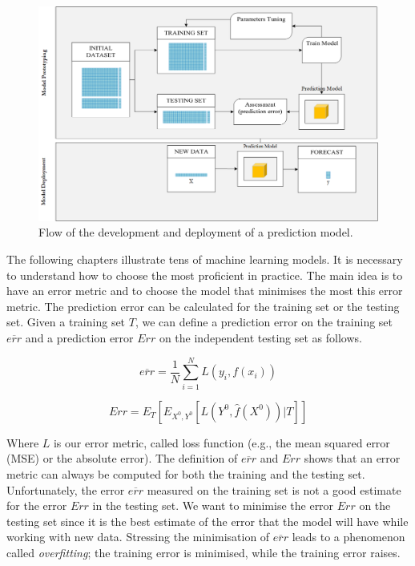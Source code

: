 \begin{figure}[hbt!]
\centering
\includegraphics[width=1\textwidth]{SectionLetsMath/linearRegression_figures/fig_trainTest.png}
\captionsetup{type=figure}
\caption{Flow of the development and deployment of a prediction model.}
\label{fig_trainTest}
\end{figure}

The following chapters illustrate tens of machine learning models. It is necessary to understand how to choose the most proficient in practice. The main idea is to have an error metric and to choose the model that minimises the most this error metric. The prediction error can be calculated for the training set or the testing set. Given a training set $T$, we can define a prediction error on the training set  $\overline{err}$ and a prediction error $Err$ on the independent testing set as follows.

\begin{equation}
\overline{err}=\frac{1}{N}\sum_{i=1}^{N}L\left(y_i,f\left(x_i\right)\right)
\label{eq_trainTestError1}
\end{equation}

\begin{equation}
Err=E_{T}\left[E_{X^0,Y^0}\left[L\left(Y^0,\hat{f}(X^0)\right)|T\right]\right]
\label{eq_trainTestError2}
\end{equation}

Where $L$ is our error metric, called loss function (e.g., the mean squared error (MSE) or the absolute error). The definition of $\overline{err}$ and $Err$ shows that an error metric can always be computed for both the training and the testing set. Unfortunately, the error $\overline{err}$ measured on the training set is not a good estimate for the error $Err$ in the testing set. We want to minimise the error $Err$ on the testing set since it is the best estimate of the error that the model will have while working with new data. Stressing the minimisation of $\overline{err}$ leads to a phenomenon called \textit{overfitting}; the training error is minimised, while the training error raises.\par

